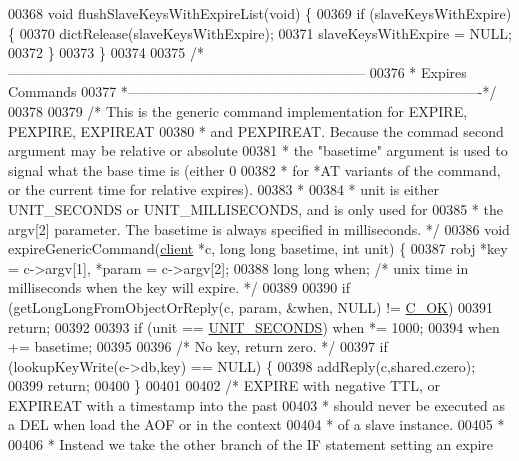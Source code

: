 \begin{DoxyCode}
{{{{{00368 \textcolor{keywordtype}{void} flushSlaveKeysWithExpireList(\textcolor{keywordtype}{void}) \{
00369     \textcolor{keywordflow}{if} (slaveKeysWithExpire) \{
00370         dictRelease(slaveKeysWithExpire);
00371         slaveKeysWithExpire = NULL;
00372     \}
00373 \}
00374 
00375 \textcolor{comment}{/*-----------------------------------------------------------------------------}
00376 \textcolor{comment}{ * Expires Commands}
00377 \textcolor{comment}{ *----------------------------------------------------------------------------*/}
00378 
00379 \textcolor{comment}{/* This is the generic command implementation for EXPIRE, PEXPIRE, EXPIREAT}
00380 \textcolor{comment}{ * and PEXPIREAT. Because the commad second argument may be relative or absolute}
00381 \textcolor{comment}{ * the "basetime" argument is used to signal what the base time is (either 0}
00382 \textcolor{comment}{ * for *AT variants of the command, or the current time for relative expires).}
00383 \textcolor{comment}{ *}
00384 \textcolor{comment}{ * unit is either UNIT\_SECONDS or UNIT\_MILLISECONDS, and is only used for}
00385 \textcolor{comment}{ * the argv[2] parameter. The basetime is always specified in milliseconds. */}
00386 \textcolor{keywordtype}{void} expireGenericCommand(\hyperlink{structclient}{client} *c, \textcolor{keywordtype}{long} \textcolor{keywordtype}{long} basetime, \textcolor{keywordtype}{int} unit) \{
00387     robj *key = c->argv[1], *param = c->argv[2];
00388     \textcolor{keywordtype}{long} \textcolor{keywordtype}{long} when; \textcolor{comment}{/* unix time in milliseconds when the key will expire. */}
00389 
00390     \textcolor{keywordflow}{if} (getLongLongFromObjectOrReply(c, param, &when, NULL) != \hyperlink{server_8h_a303769ef1065076e68731584e758d3e1}{C\_OK})
00391         \textcolor{keywordflow}{return};
00392 
00393     \textcolor{keywordflow}{if} (unit == \hyperlink{server_8h_a8553b0a6c729b15594731a0d37b4fb0d}{UNIT\_SECONDS}) when *= 1000;
00394     when += basetime;
00395 
00396     \textcolor{comment}{/* No key, return zero. */}
00397     \textcolor{keywordflow}{if} (lookupKeyWrite(c->db,key) == NULL) \{
00398         addReply(c,shared.czero);
00399         \textcolor{keywordflow}{return};
00400     \}
00401 
00402     \textcolor{comment}{/* EXPIRE with negative TTL, or EXPIREAT with a timestamp into the past}
00403 \textcolor{comment}{     * should never be executed as a DEL when load the AOF or in the context}
00404 \textcolor{comment}{     * of a slave instance.}
00405 \textcolor{comment}{     *}
00406 \textcolor{comment}{     * Instead we take the other branch of the IF statement setting an expire}
}}}}}
\end{DoxyCode}

